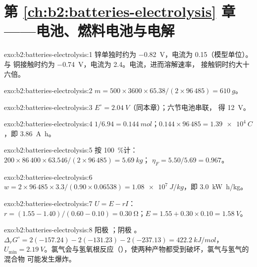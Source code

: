 \section*{第 \ref{ch:b2:batteries-electrolysis} 章——电池、燃料电池与电解}

\begin{solution}{exo:b2:batteries-electrolysis:1}
锌单独时约为 \qty{-0.82}{V}，电流为 0.15（模型单位）。与
铜接触时约为 \qty{-0.74}{V}，电流为 2.4。电流，进而溶解速率，
接触铜时约大十六倍。
\end{solution}

\begin{solution}{exo:b2:batteries-electrolysis:2}
$m = 500 \times 3600 \times 65.38/(2 \times 96\,485) = \qty{610}{g}$。
\end{solution}

\begin{solution}{exo:b2:batteries-electrolysis:3}
$E^\circ = \qty{2.04}{V}$（同本章）；六节电池串联，
得 \qty{12}{V}。
\end{solution}

\begin{solution}{exo:b2:batteries-electrolysis:4}
$1/6.94 = \qty{0.144}{mol}$；$0.144 \times 96\,485 = \qty{1.39e4}{C}$，即
\qty{3.86}{A.h}。
\end{solution}

\begin{solution}{exo:b2:batteries-electrolysis:5}
按 100~\%计：$200 \times 86\,400 \times 63.546/(2 \times 96\,485) = \qty{5.69}{kg}$；
$\eta_F = 5.50/5.69 = 0.967$。
\end{solution}

\begin{solution}{exo:b2:batteries-electrolysis:6}
$w = 2 \times 96\,485 \times 3.3/(0.90 \times 0.06538) = \qty{1.08e7}{J/kg}$，即
\qty{3.0}{kW.h/kg}。
\end{solution}

\begin{solution}{exo:b2:batteries-electrolysis:7}
$U = E - rI$：$r = (1.55 - 1.40)/(0.60 - 0.10) = \qty{0.30}{\ohm}$；$E = 1.55 + 0.30
\times 0.10 = \qty{1.58}{V}$。
\end{solution}

\begin{solution}{exo:b2:batteries-electrolysis:8}
阳极 ；阴极 。$\Delta_r G^\circ =
2(-157.24) - 2(-131.23) - 2(-237.13) = \qty{422.2}{kJ/mol}$，$U_{\min} =
\qty{2.19}{V}$。氯气会与氢氧根反应（），使两种产物都受到破坏，氯气与氢气的混合物
可能发生爆炸。
\end{solution}

